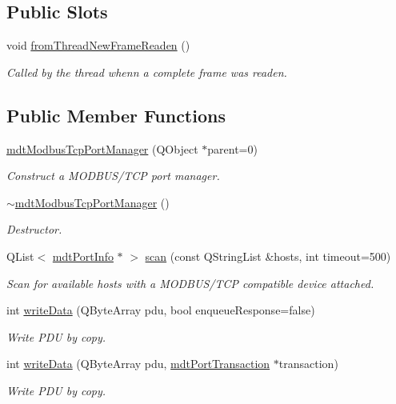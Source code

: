 \subsection*{Public Slots}
\begin{DoxyCompactItemize}
\item 
void \hyperlink{classmdt_modbus_tcp_port_manager_ad941ea607f00db54aa6deb2866a539e9}{fromThreadNewFrameReaden} ()
\begin{DoxyCompactList}\small\item\em Called by the thread whenn a complete frame was readen. \end{DoxyCompactList}\end{DoxyCompactItemize}
\subsection*{Public Member Functions}
\begin{DoxyCompactItemize}
\item 
\hyperlink{classmdt_modbus_tcp_port_manager_a2f65f779bbad19d9d3f85ef35220ffb8}{mdtModbusTcpPortManager} (QObject $\ast$parent=0)
\begin{DoxyCompactList}\small\item\em Construct a MODBUS/TCP port manager. \end{DoxyCompactList}\item 
\hyperlink{classmdt_modbus_tcp_port_manager_aabe51a50a53c6b23884cc4862730b731}{$\sim$mdtModbusTcpPortManager} ()
\begin{DoxyCompactList}\small\item\em Destructor. \end{DoxyCompactList}\item 
QList$<$ \hyperlink{classmdt_port_info}{mdtPortInfo} $\ast$ $>$ \hyperlink{classmdt_modbus_tcp_port_manager_a216ee2495440be4eefb2faf9da3c9e47}{scan} (const QStringList \&hosts, int timeout=500)
\begin{DoxyCompactList}\small\item\em Scan for available hosts with a MODBUS/TCP compatible device attached. \end{DoxyCompactList}\item 
int \hyperlink{classmdt_modbus_tcp_port_manager_ac83ea9c640869a4bccb4a4787697c646}{writeData} (QByteArray pdu, bool enqueueResponse=false)
\begin{DoxyCompactList}\small\item\em Write PDU by copy. \end{DoxyCompactList}\item 
int \hyperlink{classmdt_modbus_tcp_port_manager_a2a3ade6d3f9a6e7de47b9b089754288f}{writeData} (QByteArray pdu, \hyperlink{classmdt_port_transaction}{mdtPortTransaction} $\ast$transaction)
\begin{DoxyCompactList}\small\item\em Write PDU by copy. \end{DoxyCompactList}\end{DoxyCompactItemize}


